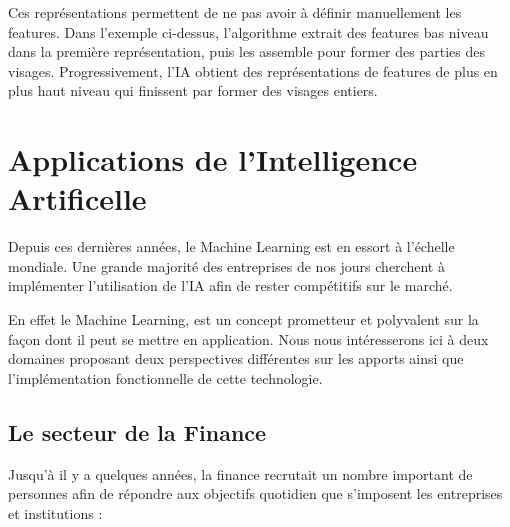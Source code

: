             Ces représentations permettent de ne pas avoir à définir manuellement les features.
            Dans l'exemple ci-dessus, l'algorithme extrait des features bas niveau dans la
            première représentation, puis les assemble pour former des parties des
            visages. Progressivement, l'IA obtient des représentations de features de plus en plus
            haut niveau qui finissent par former des visages entiers. \newline

\chapter{Applications de l'Intelligence Artificelle}
    Depuis ces dernières années, le Machine Learning est en essort à l'échelle mondiale.
    Une grande majorité des entreprises de nos jours cherchent à implémenter l'utilisation de l'IA
    afin de rester compétitifs sur le marché. \newline

    En effet le Machine Learning, est un concept prometteur
    et polyvalent sur la façon dont il peut se mettre en application.
    Nous nous intéresserons ici à deux domaines proposant deux perspectives différentes
    sur les apports ainsi que l'implémentation fonctionnelle de cette technologie.

    \section{Le secteur de la Finance}
        Jusqu'à il y a quelques années, la finance recrutait un nombre
        important de personnes afin de répondre aux objectifs quotidien
        que s'imposent les entreprises et institutions :\newline

